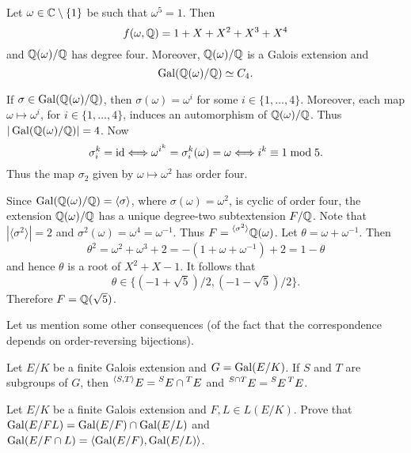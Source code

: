 \begin{example}
    Let $\omega\in\mathbb{C}\setminus\{1\}$ be such that $\omega^5=1$.
    Then 
    \[
    f(\omega,\mathbb{Q})=1+X+X^2+X^3+X^4
    \]
    and $\mathbb{Q}(\omega)/\mathbb{Q}$ has
    degree four. 
    Moreover, $\mathbb{Q}(\omega)/\mathbb{Q}$ is a Galois extension
    and 
    \[
    \operatorname{Gal}(\mathbb{Q}(\omega)/\mathbb{Q})\simeq C_4.
    \]
    
    If $\sigma\in \operatorname{Gal}(\mathbb{Q}(\omega)/\mathbb{Q})$,
    then $\sigma(\omega)=\omega^i$ for some $i\in\{1,\dots,4\}$. 
    Moreover, each  
    map $\omega\mapsto\omega^i$, for $i\in\{1,\dots,4\}$, induces an automorphism
    of $\mathbb{Q}(\omega)/\mathbb{Q}$. Thus $|\operatorname{Gal}(\mathbb{Q}(\omega)/\mathbb{Q})|=4$. Now 
    \[
    \sigma_i^k=\operatorname{id}\Longleftrightarrow
    \omega^{i^k}=\sigma_i^k(\omega)=\omega\Longleftrightarrow
    i^k\equiv1\bmod 5.
    \]
    Thus the map $\sigma_2$ given 
    by $\omega\mapsto\omega^2$ has order four. 
    
    Since $\operatorname{Gal}(\mathbb{Q}(\omega)/\mathbb{Q})=\langle\sigma\rangle$,
    where $\sigma(\omega)=\omega^2$, 
    is cyclic of order four, 
    the extension $\mathbb{Q}(\omega)/\mathbb{Q}$ has a unique degree-two 
    subtextension $F/\mathbb{Q}$. Note that $|\langle\sigma^2\rangle|=2$ 
    and $\sigma^2(\omega)=\omega^4=\omega^{-1}$. Thus 
    $F=\prescript{\langle\sigma^2\rangle}{}{\mathbb{Q}(\omega)}$. Let 
    $\theta=\omega+\omega^{-1}$. Then 
    \[
    \theta^2=\omega^2+\omega^3+2=-(1+\omega+\omega^{-1})+2=1-\theta
    \]
    and hence $\theta$ is a root of $X^2+X-1$. It follows that 
    \[
    \theta\in\{(-1+\sqrt{5})/2,(-1-\sqrt{5})/2\}.
    \]
    Therefore
    $F=\mathbb{Q}(\sqrt{5})$. 
\end{example}

Let us mention some other consequences (of the fact that the correspondence 
depends on order-reversing bijections). 

\begin{exercise}
    Let $E/K$ be a finite Galois extension and $G=\operatorname{Gal}(E/K)$. 
    If $S$ and $T$ are subgroups of $G$, then 
    $\prescript{\langle S,T\rangle}{}{E}=\prescript{S}{}{E}\cap \prescript{T}{}{E}$ and 
    $\prescript{S\cap T}{}{E}=\prescript{S}{}{E}\prescript{T}{}{E}$.
\end{exercise}

\begin{exercise}
Let $E/K$ be a finite Galois extension 
and $F,L\in L(E/K)$. Prove that $\operatorname{Gal}(E/FL)=\operatorname{Gal}(E/F)\cap\operatorname{Gal}(E/L)$ and 
$\operatorname{Gal}(E/F\cap L)=\langle\operatorname{Gal}(E/F),\operatorname{Gal}(E/L)\rangle$.    
\end{exercise}



